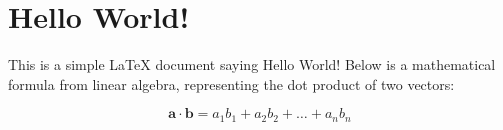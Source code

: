 \documentclass{article}
\begin{document}
\section*{Hello World!}

This is a simple LaTeX document saying Hello World! Below is a mathematical formula from linear algebra, representing the dot product of two vectors:

\[
\mathbf{a} \cdot \mathbf{b} = a_1b_1 + a_2b_2 + \dots + a_nb_n
\]
\end{document}
